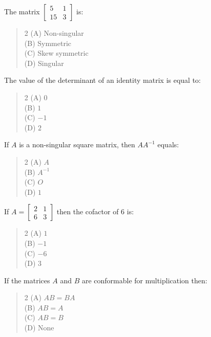 \documentclass[11pt,a4paper]{article}
\begin{document}
\begin{mcqlist}
\item The matrix $\begin{bmatrix}5&1\\15&3\end{bmatrix}$ is:
\begin{quote}\begin{multicols}{2}
\noindent (A) Non-singular \\
(B) Symmetric \\
(C) Skew symmetric \\
(D) Singular
\end{multicols}\end{quote}

\item The value of the determinant of an identity matrix is equal to:
\begin{quote}\begin{multicols}{2}
\noindent (A) $0$ \\
(B) $1$ \\
(C) $-1$ \\
(D) $2$
\end{multicols}\end{quote}

\item If $A$ is a non-singular square matrix, then $AA^{-1}$ equals:
\begin{quote}\begin{multicols}{2}
\noindent (A) $A$ \\
(B) $A^{-1}$ \\
(C) $O$ \\
(D) $1$
\end{multicols}\end{quote}

\item If $A=\begin{bmatrix}2&1\\6&3\end{bmatrix}$ then the cofactor of $6$ is:
\begin{quote}\begin{multicols}{2}
\noindent (A) $1$ \\
(B) $-1$ \\
(C) $-6$ \\
(D) $3$
\end{multicols}\end{quote}

\item If the matrices $A$ and $B$ are conformable for multiplication then:
\begin{quote}\begin{multicols}{2}
\noindent (A) $AB=BA$ \\
(B) $AB=A$ \\
(C) $AB=B$ \\
(D) None
\end{multicols}\end{quote}


\end{mcqlist}
\end{document}
